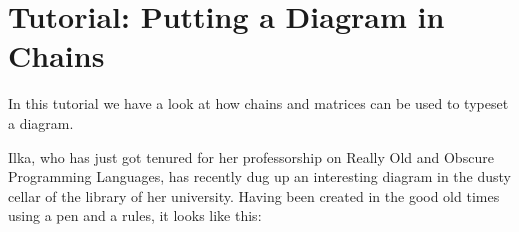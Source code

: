 %
%
%


\section{Tutorial: Putting a Diagram in Chains}

In this tutorial we have a look at how chains and matrices can be used
to typeset a diagram.

Ilka, who has just got tenured for her professorship on Really Old and
Obscure Programming Languages, has recently dug up an interesting
diagram in the dusty cellar of the library of her university. Having
been created in the good old times using a pen and a rules, it looks
like this:

